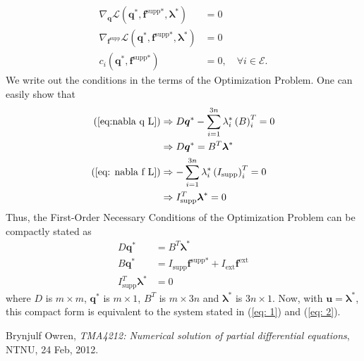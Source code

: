\documentclass[10pt,a4paper]{article}
\begin{document}
\begin{align}
\nabla_{\boldsymbol{q}}\mathcal{L}\left(\boldsymbol{q}^*,\boldsymbol{f}^\text{supp*},\boldsymbol{\lambda}^*\right) &= 0 \label{eq:nabla q L} \\
\nabla_{\boldsymbol{f}^\text{supp}}\mathcal{L}\left(\boldsymbol{q}^*,\boldsymbol{f}^\text{supp*},\boldsymbol{\lambda}^*\right) &= 0 \label{eq: nabla f L} \\
c_i\left(\boldsymbol{q}^*,\boldsymbol{f}^\text{supp*}\right) &= 0, \quad \forall i \in \mathcal{E}. \label{eq: ci=0 all i in E}
\end{align}
We write out the conditions in the terms of the Optimization Problem. One can easily show that
\begin{align*}
\left(\ref{eq:nabla q L}\right) &\Rightarrow D\boldsymbol{q}^* - \sum_{i=1}^{3n}\lambda_i^*\left(B\right)_i^T = 0 \\
 &\Rightarrow D\boldsymbol{q}^* = B^T\boldsymbol{\lambda}^* \\
\left(\ref{eq: nabla f L}\right) &\Rightarrow -\sum_{i=1}^{3n}\lambda_i^*\left(I_\text{supp}\right)_i^T = 0 \\
 &\Rightarrow I_\text{supp}^T\boldsymbol{\lambda}^* = 0
\end{align*}
Thus, the First-Order Necessary Conditions of the Optimization Problem can be compactly stated as 
\begin{align*}
D\boldsymbol{q}^* &= B^T\boldsymbol{\lambda}^* \\
B\boldsymbol{q}^* &= I_\text{supp}\boldsymbol{f}^\text{supp*} + I_\text{ext}\boldsymbol{f}^\text{ext}\\
I_\text{supp}^T\boldsymbol{\lambda}^* &= 0
\end{align*} 
where $D$ is $m\times m$, $\boldsymbol{q}^*$ is $m\times 1$, $B^T$ is $m\times 3n$ and $\boldsymbol{\lambda}^*$ is $3n \times 1$. Now, with $\boldsymbol{u} = \boldsymbol{\lambda}^*$, this compact form is equivalent to the system stated in (\ref{eq: 1}) and (\ref{eq: 2}).



\begin{thebibliography}{2}
Brynjulf Owren, \emph{TMA4212: Numerical solution of partial differential equations}, NTNU, 24 Feb, 2012.
\end{thebibliography}
\end{document}
